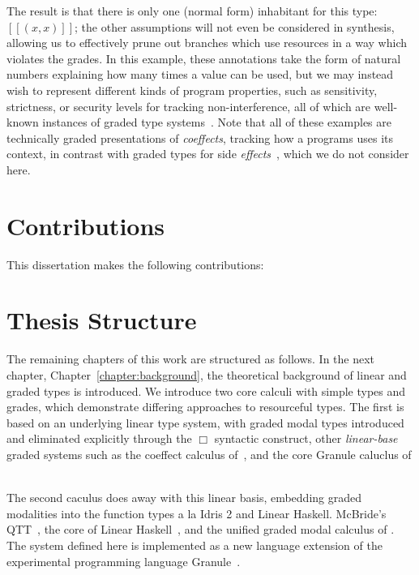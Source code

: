 The result is that there is only one (normal form) inhabitant for this type: $[[
(x, x) ]]$; the other assumptions will not even be considered in synthesis,
allowing us to effectively prune out branches which use resources in a way which
violates the grades. In this example, these annotations take the form of natural
numbers explaining how many times a value can be used, but we may instead wish
to represent different kinds of program properties, such as sensitivity,
strictness, or security levels for tracking non-interference, all of which are
well-known instances of graded type
systems~\cite{DBLP:journals/pacmpl/OrchardLE19,DBLP:conf/icfp/GaboardiKOBU16,DBLP:journals/pacmpl/AbelB20}.
Note that all of these examples are technically graded presentations of
\emph{coeffects}, tracking how a programs uses its context, in contrast with
graded types for side
\emph{effects}~\cite{DBLP:journals/corr/OrchardPM14,DBLP:conf/popl/Katsumata14}, which we do not consider here.

\section{Contributions}
This dissertation makes the following contributions:
\section{Thesis Structure}
The remaining chapters of this work are structured as follows. In the next
chapter, Chapter~\ref{chapter:background}, the theoretical background of linear
and graded types is introduced. We introduce two core calculi with simple types
and grades, which demonstrate differing approaches to resourceful types. The
first is based on an underlying linear type system, with graded modal types
introduced and eliminated explicitly through the $\Box$ syntactic construct,
other \emph{linear-base} graded systems such as the coeffect calculus
of~\citet{petricek2014coeffects}, and the core Granule caluclus of ~\cite{}

The second caculus does away with this linear basis, embedding graded modalities
into the function types a la Idris 2 and Linear Haskell. McBride's
QTT~\cite{McBride2016,quantitative-type-theory}, the core of Linear
Haskell~\cite{DBLP:journals/pacmpl/BernardyBNJS18}, and the unified graded modal
calculus of \citet{DBLP:journals/pacmpl/AbelB20}. The system defined here is
implemented as a new language extension of the experimental programming language
Granule~\cite{DBLP:journals/pacmpl/OrchardLE19}.

